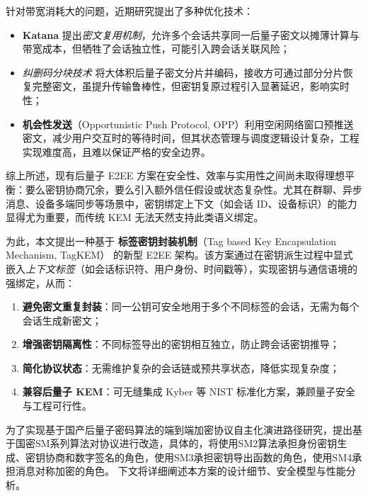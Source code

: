 针对带宽消耗大的问题，近期研究提出了多种优化技术：
\begin{itemize}
    \item \textbf{Katana} 提出\textit{密文复用机制}\cite{dodis2025triple}，允许多个会话共享同一后量子密文以摊薄计算与带宽成本，但牺牲了会话独立性，可能引入跨会话关联风险；
                                                                    
    \item \textit{纠删码分块技术} 将大体积后量子密文分片并编码，接收方可通过部分分片恢复完整密文，虽提升传输鲁棒性，但密钥复原过程引入显著延迟，影响实时性；
    
    \item \textbf{机会性发送}（Opportunistic Push Protocol, OPP\cite{auerbach2025compare}）利用空闲网络窗口预推送密文，减少用户交互时的等待时间，但其状态管理与调度逻辑设计复杂，工程实现难度高，且难以保证严格的安全边界。
\end{itemize}

综上所述，现有后量子 E2EE 方案在安全性、效率与实用性之间尚未取得理想平衡：要么密钥协商冗余，要么引入额外信任假设或状态复杂性。尤其在群聊、异步消息、设备多端同步等场景中，密钥绑定上下文（如会话 ID、设备标识）的能力显得尤为重要，而传统 KEM 无法天然支持此类语义绑定。

为此，本文提出一种基于 \textbf{标签密钥封装机制}（Tag based Key Encapsulation Mechanism, TagKEM） 的新型 E2EE 架构。该方案通过在密钥派生过程中显式嵌入\textit{上下文标签}（如会话标识符、用户身份、时间戳等），实现密钥与通信语境的强绑定，从而：
\begin{enumerate}
    \item \textbf{避免密文重复封装}：同一公钥可安全地用于多个不同标签的会话，无需为每个会话生成新密文；
    
    \item \textbf{增强密钥隔离性}：不同标签导出的密钥相互独立，防止跨会话密钥推导；
    
    \item \textbf{简化协议状态}：无需维护复杂的会话链或预共享状态，降低实现复杂度；
    
    \item \textbf{兼容后量子 KEM}：可无缝集成 Kyber 等 NIST 标准化方案，兼顾量子安全与工程可行性。
\end{enumerate}
为了实现基于国产后量子密码算法的端到端加密协议自主化演进路径研究，提出基于国密SM系列算法对协议进行改造，具体的，将使用SM2算法承担身份密钥生成、密钥协商和数字签名的角色，使用SM3承担密钥导出函数的角色，使用SM4承担消息对称加密的角色。
下文将详细阐述本方案的设计细节、安全模型与性能分析。


